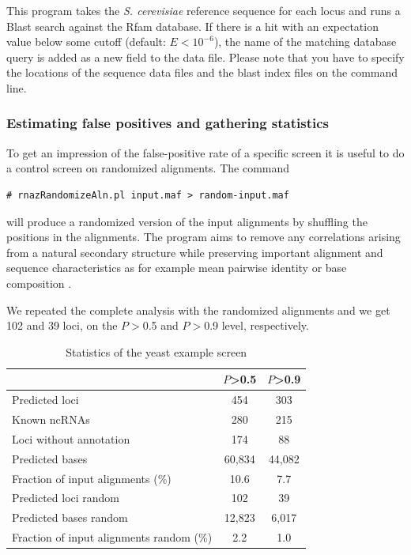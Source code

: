 \documentclass[11pt]{article}
\begin{document}
This program takes the \emph{S. cerevisiae} reference sequence for each
locus and runs a Blast search against the Rfam database.  If there is a hit
with an expectation value below some cutoff (default: $E<10^{-6}$), the
name of the matching database query is added as a new field to the data
file. Please note that you have to specify the locations of the sequence
data files and the blast index files on the command line.


\subsubsection{Estimating false positives and gathering statistics}
\label{sec:estim-false-posit-1}

To get an impression of the false-positive rate of a specific screen it is
useful to do a control screen on randomized alignments. The command

\begin{verbatim}
# rnazRandomizeAln.pl input.maf > random-input.maf
\end{verbatim}

will produce a randomized version of the input alignments by shuffling the
positions in the alignments. The program aims to remove any correlations
arising from a natural secondary structure while preserving important
alignment and sequence characteristics as for example mean pairwise
identity or base composition \cite{washietl04}.

We repeated the complete analysis with the randomized alignments and we get
102 and 39 loci, on the $P>$0.5 and $P>$0.9 level, respectively. 

\begin{table}
  \caption{Statistics of the yeast example screen}

  \begin{center}
    \begin{tabular}{lcc}\toprule
      & $P$>0.5 & $P$>0.9\\
      \midrule
    Predicted loci & 454 & 303\\
    Known ncRNAs & 280 & 215\\
    Loci without annotation & 174 & 88\\
    Predicted bases & 60,834 & 44,082\\
    Fraction of input alignments (\%) & 10.6 & 7.7\\
    Predicted loci random & 102 & 39\\
    Predicted bases random& 12,823 & 6,017\\
    Fraction of input alignments random (\%) & 2.2 & 1.0\\
    \bottomrule
  \end{tabular}
\end{center}
\end{table}
\end{document}
